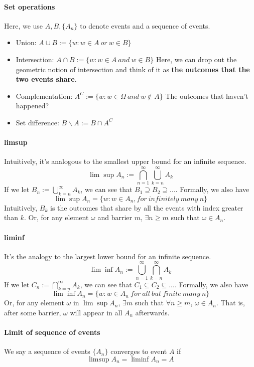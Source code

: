 \documentclass[Probability Theory.tex]{subfiles}
\begin{document}
\paragraph{Set operations} Here, we use $A,B,\{A_n\}$ to denote events and a sequence of events.
\begin{itemize}
	\item Union: $A\cup B := \{w:w\in A\ or\ w\in B \}$
	\item Intersection: $A\cap B := \{w:w\in A\ and\ w\in B \}$
	Here, we can drop out the geometric notion of intersection and think of it as {\bf the outcomes that the two events share}.
	\item Complementation: $A^C:=\{w:w\in\Omega\ and\ w\notin A \}$
	The outcomes that haven't happened?
	\item Set difference: $B\backslash A:= B\cap A^C$
\end{itemize}

\paragraph{limsup}
Intuitively, it's analogous to the smallest upper bound for an infinite sequence.
$$\lim\sup A_n := \bigcap_{n=1}^{\infty}\bigcup_{k=n}^{\infty} A_k$$
If we let $B_n:=\bigcup_{k=n}^{\infty} A_k$, we can see that $B_1\supseteq B_2\supseteq...$. Formally, we also have
$$\lim\sup A_n = \{w:w\in A_n, for\ infinitely\ many\ n \}$$
Intuitively, $B_k$ is the outcomes that share by all the events with index greater than $k$.
Or, for any element $\omega$ and barrier $m$, $\exists n\geq m$ such that $\omega\in A_n$.

\paragraph{liminf}
It's the analogy to the largest lower bound for an infinite sequence.
$$\lim\inf A_n:= \bigcup_{n=1}^{\infty}\bigcap_{k=n}^{\infty} A_k$$
If we let $C_n:= \bigcap_{k=n}^{\infty} A_k$, we can see that $C_1\subseteq C_2\subseteq...$. Formally, we also have
$$\lim\inf A_n=\{w:w\in A_n\ for\ all\ but\ finite\ many\ n \}$$
Or, for any element $\omega$ in $\lim\sup A_n$, $\exists m$ such that $\forall n\geq m$, $\omega\in A_n$. That is, after some barrier, $\omega$ will appear in all $A_n$ afterwards.

\paragraph{Limit of sequence of events}
We say a sequence of events $\{A_n\}$ converges to event $A$ if 
$$\limsup A_n=\liminf A_n = A$$
\end{document}
